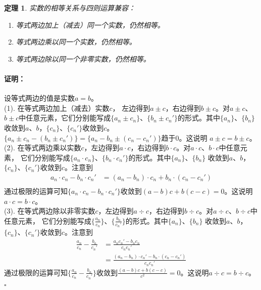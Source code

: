 \documentclass[12pt,UTF8]{ctexbook}
\newtheorem{tm}{定理}[section]
\renewenvironment{proof}{\paragraph{\textbf{证明：}}}{\hfill$\square$}
\begin{document}
\begin{appendix}
\begin{tm}\label{tm:a-1-25}
    实数的相等关系与四则运算兼容：
    \begin{enumerate}
        \item 等式两边加上（减去）同一个实数，仍然相等。
        \item 等式两边乘以同一个实数，仍然相等。
        \item 等式两边除以同一个非零实数，仍然相等。
    \end{enumerate}
\end{tm}
\begin{proof}
    设等式两边的值是实数$a=b$。\\
    (1). 在等式两边加上（减去）实数$c$，
    左边得到$a\pm c$，右边得到$b\pm c$。对$a\pm c$、$b\pm c$中任意元素，它们分别能写成$\{a_n\pm c_n\}$、$\{b_n\pm c_n'\}$的形式。其中$\{a_n\}$、$\{b_n\}$
    收敛到$a$、$b$，$\{c_n\}$、$\{c_n'\}$收敛到$c$。$\{a_n\pm c_n-(b_n\pm c_n')\} = \{a_n - b_n \pm  (c_n - c_n')\}$趋于$0$。这说明
    $a\pm c = b\pm c$。\\
    (2). 在等式两边乘以实数$c$，左边得到$a\cdot c$，右边得到$b\cdot c$。对$a\cdot c$、$b\cdot c$中任意元素，
    它们分别能写成$\{a_n\cdot c_n\}$、$\{b_n\cdot c_n'\}$的形式。其中$\{a_n\}$、$\{b_n\}$
    收敛到$a$、$b$，$\{c_n\}$、$\{c_n'\}$收敛到$c$。注意到
    \begin{align*}
        a_n\cdot c_n - b_n\cdot c_n' &= (a_n - b_n)\cdot c_n + b_n\cdot(c_n - c_n')  \\
    \end{align*}
    通过极限的运算可知$\{a_n\cdot c_n - b_n\cdot c_n'\}$收敛到$(a - b)c + b(c - c) = 0$。这说明$a\cdot c = b\cdot c$。\\
    (3). 在等式两边除以非零实数$c$，左边得到$a\div c$，右边得到$b\div c$。对$a\div c$、$b\div c$中任意元素，
    它们分别能写成$\{\frac{a_n}{c_n}\}$、$\{\frac{b_n}{c_n'}\}$的形式。其中$\{a_n\}$、$\{b_n\}$
    收敛到$a$、$b$，$\{c_n\}$、$\{c_n'\}$收敛到$c$。注意到
    \begin{align*}
        \frac{a_n}{c_n} - \frac{b_n}{c_n'} &= \frac{a_nc_n' - b_nc_n}{c_nc_n'}  \\
        &= \frac{(a_n - b_n)\cdot c_n' - b_n\cdot(c_n - c_n')}{c_nc_n'}
    \end{align*}
    通过极限的运算可知$\{\frac{a_n}{c_n} - \frac{b_n}{c_n'}\}$收敛到$\frac{(a - b)c + b(c - c)}{c^2} = 0$。这说明$a\div c = b\div c$。\\
\end{proof}


\end{appendix}
\end{document}
